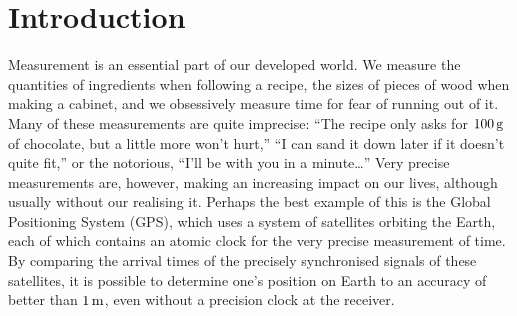 \chapter{Introduction}
\label{Introduction}
\graphicspath{{Figures/Introduction/}{Figures/Common/}}





Measurement is an essential part of our developed world.  We measure the quantities of ingredients when following a recipe, the sizes of pieces of wood when making a cabinet, and we obsessively measure time for fear of running out of it.  Many of these measurements are quite imprecise: ``The recipe only asks for $\unit[100]{g}$ of chocolate, but a little more won't hurt,'' ``I can sand it down later if it doesn't quite fit,'' or the notorious, ``I'll be with you in a minute\dots''  Very precise measurements are, however, making an increasing impact on our lives, although usually without our realising it.  Perhaps the best example of this is the Global Positioning System (GPS), which uses a system of satellites orbiting the Earth, each of which contains an atomic clock for the very precise measurement of time.  By comparing the arrival times of the precisely synchronised signals of these satellites, it is possible to determine one's position on Earth to an accuracy of better than $\unit[1]{m}$, even without a precision clock at the receiver.

